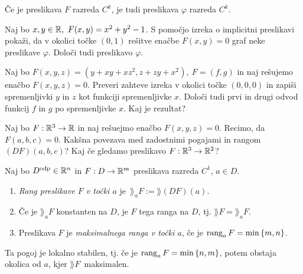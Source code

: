 \begin{posledica}
    Če je preslikava $F$ razreda $C^k$, je tudi preslikava $\varphi$ razreda $C^k$.
\end{posledica}

\begin{zgled}
    Naj bo $x,y \in \mathbb{R}, \ F(x, y) = x^2 + y^2 -1$. S pomočjo izreka o implicitni preslikavi pokaži, da v okolici točke $(0,1)$ rešitve enačbe $F(x,y) = 0$ graf neke preslikave $\varphi$. Določi tudi preslikavo $\varphi$.
\end{zgled}

\begin{zgled}
    Naj bo $F(x,y,z) = (y + xy+xz^2, z+zy+x^2), \ F = (f, g)$ in naj rešujemo enačbo $F(x,y,z) = 0$. Preveri zahteve izreka v okolici točke $(0,0,0)$ in zapiši spremenljivki $y$ in $z$ kot funkciji spremenljivke $x$. Določi tudi prvi in drugi odvod funkcij $f$ in $g$ po spremenljivke $x$. Kaj je rezultat?
\end{zgled}

\begin{zgled}
    Naj bo $F: \mathbb{R}^3 \to \mathbb{R}$ in naj rešuejmo enačbo $F(x,y,z) = 0$. Recimo, da $F(a,b,c) = 0$. Kakšna povezava med zadostnimi pogajami in rangom $(DF)(a,b,c)$? Kaj če gledamo preslikavo $F: \mathbb{R}^3 \to \mathbb{R}^2$?
\end{zgled}

\begin{definicija}
    Naj bo $D^\text{odp} \in \mathbb{R}^n$ in $F: D \to \mathbb{R}^m$ preslikava razreda $C^1$, $a \in D$. 
    \begin{enumerate}
        \item \emph{Rang preslikave $F$ v točki $a$} je~$\rang_aF := \rang (DF)(a)$.
        \item Če je $\rang_aF$ konstanten na $D$, je $F$ tega ranga na $D$, tj. $\rang F = \rang_aF$.
        \item Preslikava $F$ je \emph{maksimalnega ranga v točki $a$}, če je $\operatorname{rang}_aF = \min \left\{m, n\right\}$.
    \end{enumerate}      
\end{definicija}

\begin{opomba}
    Ta pogoj je lokalno stabilen, tj. če je $\operatorname{rang}_aF = \min \left\{n, m\right\}$, potem obstaja okolica od $a$, kjer $\rang F$~maksimalen.
\end{opomba}

